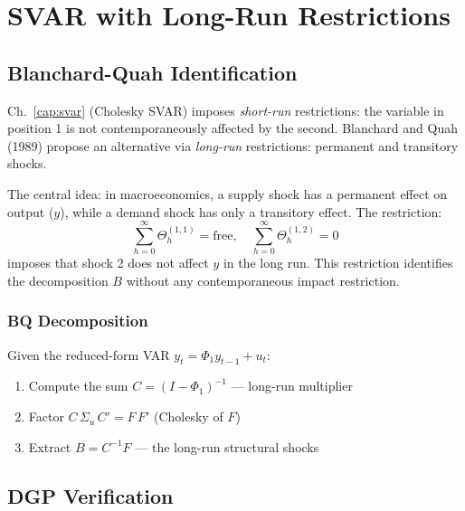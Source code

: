 \chapter{SVAR with Long-Run Restrictions}
\label{cap:svar2}

\section{Blanchard-Quah Identification}

Ch.~\ref{cap:svar} (Cholesky SVAR) imposes \emph{short-run} restrictions:
the variable in position 1 is not contemporaneously affected by the second.
Blanchard and Quah (1989) propose an alternative via \emph{long-run}
restrictions: permanent and transitory shocks.

The central idea: in macroeconomics, a supply shock has a permanent effect
on output ($y$), while a demand shock has only a transitory effect. The restriction:
\[
  \sum_{h=0}^\infty \Theta_h^{(1,1)} = \text{free}, \quad
  \sum_{h=0}^\infty \Theta_h^{(1,2)} = 0
\]
imposes that shock 2 does not affect $y$ in the long run. This restriction identifies
the decomposition $B$ without any contemporaneous impact restriction.

\subsection*{BQ Decomposition}

Given the reduced-form VAR $y_t = \Phi_1 y_{t-1} + u_t$:
\begin{enumerate}
  \item Compute the sum $C = (I - \Phi_1)^{-1}$ — long-run multiplier
  \item Factor $C\,\Sigma_u\,C' = F\,F'$ (Cholesky of $F$)
  \item Extract $B = C^{-1} F$ — the long-run structural shocks
\end{enumerate}

\section{DGP Verification}


